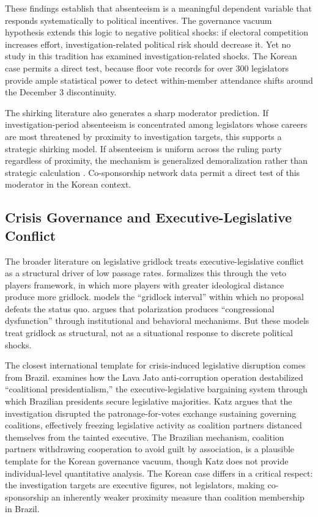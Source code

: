 \documentclass[11pt]{article}
\begin{document}
These findings establish that absenteeism is a meaningful dependent variable that responds systematically to political incentives. The governance vacuum hypothesis extends this logic to negative political shocks: if electoral competition increases effort, investigation-related political risk should decrease it. Yet no study in this tradition has examined investigation-related shocks. The Korean case permits a direct test, because floor vote records for over 300 legislators provide ample statistical power to detect within-member attendance shifts around the December 3 discontinuity.

The shirking literature also generates a sharp moderator prediction. If investigation-period absenteeism is concentrated among legislators whose careers are most threatened by proximity to investigation targets, this supports a strategic shirking model. If absenteeism is uniform across the ruling party regardless of proximity, the mechanism is generalized demoralization rather than strategic calculation \citep{hoeyland2017}. Co-sponsorship network data permit a direct test of this moderator in the Korean context.

\subsection{Crisis Governance and Executive-Legislative Conflict}

The broader literature on legislative gridlock treats executive-legislative conflict as a structural driver of low passage rates. \citet{tsebelis2002} formalizes this through the veto players framework, in which more players with greater ideological distance produce more gridlock. \citet{krehbiel1998} models the ``gridlock interval'' within which no proposal defeats the status quo. \citet{mccarty2017} argues that polarization produces ``congressional dysfunction'' through institutional and behavioral mechanisms. But these models treat gridlock as structural, not as a situational response to discrete political shocks.

The closest international template for crisis-induced legislative disruption comes from Brazil. \citet{katz2018} examines how the Lava Jato anti-corruption operation destabilized ``coalitional presidentialism,'' the executive-legislative bargaining system through which Brazilian presidents secure legislative majorities. Katz argues that the investigation disrupted the patronage-for-votes exchange sustaining governing coalitions, effectively freezing legislative activity as coalition partners distanced themselves from the tainted executive. The Brazilian mechanism, coalition partners withdrawing cooperation to avoid guilt by association, is a plausible template for the Korean governance vacuum, though Katz does not provide individual-level quantitative analysis. The Korean case differs in a critical respect: the investigation targets are executive figures, not legislators, making co-sponsorship an inherently weaker proximity measure than coalition membership in Brazil.
\end{document}
